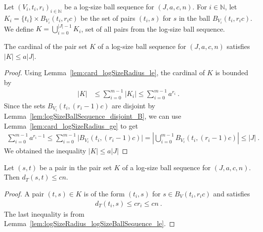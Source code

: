 \begin{definition}\label{def:pairSet}
  \leanok
Let $(V_i, t_i, r_i)_{i \in \mathbb{N}}$ be a log-size ball sequence for $(J, a, c, n)$.
For $i \in \mathbb{N}$, let $K_i = \{t_i\} \times B_{V_i}(t_i, r_i c)$ be the set of pairs $(t_i, s)$ for $s$ in the ball $B_{V_i}(t_i, r_i c)$.
We define $K = \bigcup_{i=0}^{\vert J \vert-1} K_i$, set of all pairs from the log-size ball sequence.
\end{definition}


\begin{lemma}\label{lem:card_pairSet_le}
  \leanok
The cardinal of the pair set $K$ of a log-size ball sequence for $(J, a, c, n)$ satisfies $|K| \le a |J|$.
\end{lemma}

\begin{proof}
  \leanok
Using Lemma~\ref{lem:card_logSizeRadius_le}, the cardinal of $K$ is bounded by
\begin{align*}
  \vert K \vert
  &\le \sum_{i=0}^{m-1} \vert K_i \vert
  \le \sum_{i=0}^{m-1} a^{r_i}
  \: .
\end{align*}
Since the sets $B_{V_i}(t_i, (r_i-1)c)$ are disjoint by Lemma~\ref{lem:logSizeBallSequence_disjoint_B}, we can use Lemma~\ref{lem:card_logSizeRadius_ge} to get
\begin{align*}
  \sum_{i=0}^{m-1} a^{r_i - 1}
  \le \sum_{i=0}^{m-1} \vert B_{V_i}(t_i, (r_i-1)c) \vert
  = \left\vert \bigcup_{i=0}^{m-1} B_{V_i}(t_i, (r_i-1)c) \right\vert
  \le \vert J \vert
  \: .
\end{align*}
We obtained the inequality $\vert K \vert \le a \vert J \vert$
\end{proof}


\begin{lemma}\label{lem:dist_le_of_mem_pairSet}
  \leanok
Let $(s, t)$ be a pair in the pair set $K$ of a log-size ball sequence for $(J, a, c, n)$.
Then $d_T(s, t) \le c n$.
\end{lemma}

\begin{proof}
  \leanok
A pair $(t, s) \in K$ is of the form $(t_i, s)$ for $s \in B_V(t_i, r_i c)$ and satisfies
\begin{align*}
  d_T(t_i, s) \le c r_i \le c n \: .
\end{align*}
The last inequality is from Lemma~\ref{lem:logSizeRadius_logSizeBallSequence_le}.
\end{proof}


